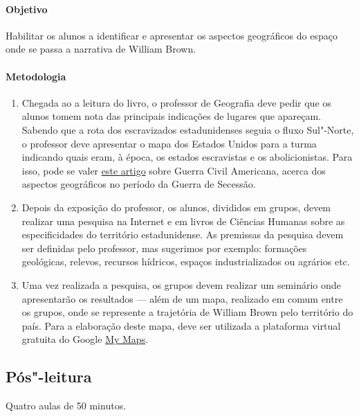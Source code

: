 \documentclass[12pt]{extarticle}
\begin{document}
 \paragraph{Objetivo} Habilitar os alunos a identificar e apresentar 
 os aspectos geográficos do espaço onde se passa a narrativa de William Brown.

 \paragraph{Metodologia}
   \begin{enumerate}
    \item
    Chegada ao a leitura do livro, o professor de Geografia deve 
    pedir que os alunos tomem nota das principais indicações de lugares
    que apareçam. Sabendo que a rota dos escravizados estadunidenses seguia
    o fluxo Sul"-Norte, o professor deve apresentar o mapa dos Estados Unidos
    para a turma indicando quais eram, à época, os estados escravistas
    e os abolicionistas. Para isso, pode se valer \href{https://brasilescola.uol.com.br/historiag/guerra-secessao.htm}{este artigo} sobre Guerra Civil Americana,
    acerca dos aspectos geográficos no período da Guerra de Secessão. 
    
    \item
    Depois da exposição do professor, os alunos, divididos em grupos,
    devem realizar uma pesquisa na Internet e em livros de Ciências Humanas
    sobre as especificidades do território
    estadunidense. As premissas da pesquisa devem ser definidas pelo
    professor, mas sugerimos por exemplo: formações geológicas,
    relevos, recursos hídricos, espaços industrializados ou agrários etc.

    \item
    Uma vez realizada a pesquisa, os grupos devem realizar um seminário
    onde apresentarão os resultados --- além de um mapa, realizado em comum
    entre os grupos, onde se represente a trajetória de William Brown pelo
    território do país. Para a elaboração deste mapa, deve ser utilizada 
    a plataforma virtual gratuita do Google \href{https://www.google.com/intl/pt-BR/maps/about/mymaps/}{My Maps}.
       \end{enumerate}


\subsection{Pós"-leitura} Quatro aulas de 50 minutos.
\end{document}
